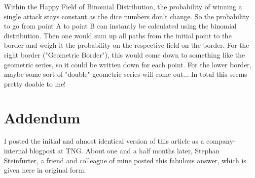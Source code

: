 \documentclass[11pt,a4paper]{article}
\begin{document}
    Within the Happy Field of Binomial Distribution, the probability of winning a single attack stays constant as the dice numbers don't change.
    So the probability to go from point A to point B can instantly be calculated using the binomial distribution.
    Then one would sum up all paths from the initial point to the border and weigh it the probability on the respective field on the border.
    For the right border ("Geometric Border"), this would come down to something like the geometric series, so it could be written down for each point.
    For the lower border, maybe some sort of "double" geometric series will come out... In total this seems pretty doable to me!


    \section{Addendum}
    I posted the initial and almost identical version of this article as a company-internal blogpost at TNG.
    About one and a half months later, Stephan Steinfurter, a friend and colleague of mine posted this fabulous answer, which is given here in original form:\\
\end{document}
